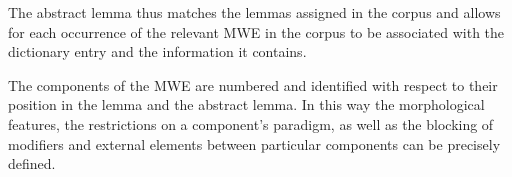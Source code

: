 \documentclass[output=paper,colorlinks,citecolor=brown]{langscibook}
\begin{document}
The abstract lemma thus matches the lemmas assigned in the corpus and allows for each occurrence of the relevant MWE in the corpus to be associated with the dictionary entry and the information it contains.






The components of the MWE are numbered and identified with respect to their position in the lemma and the abstract lemma. In this way the morphological features, the restrictions on a component's paradigm, as well as the blocking of modifiers and external elements between particular components can be precisely defined.
\end{document}
